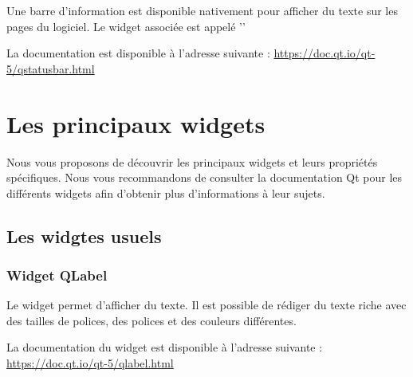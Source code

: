 \documentclass[12pt]{report}    %
\begin{document}
Une barre d'information est disponible nativement pour afficher du texte sur les pages du logiciel. \newline Le widget associée est appelé '' 




La documentation est disponible à l'adresse suivante : \newline \url{https://doc.qt.io/qt-5/qstatusbar.html}


\chapter{Les principaux widgets}

Nous vous proposons de découvrir les principaux widgets et leurs propriétés spécifiques.
\newline
Nous vous recommandons de consulter la documentation Qt pour les différents widgets afin d'obtenir plus d'informations à leur sujets.

\section{Les widgtes usuels}
\subsection{Widget QLabel}

Le widget  permet d'afficher du texte. 
Il est possible de rédiger du texte riche avec des tailles de polices, des polices et des couleurs différentes. \newline \newline


La documentation du widget est disponible à l'adresse suivante : \newline  \url{https://doc.qt.io/qt-5/qlabel.html}
\end{document}
